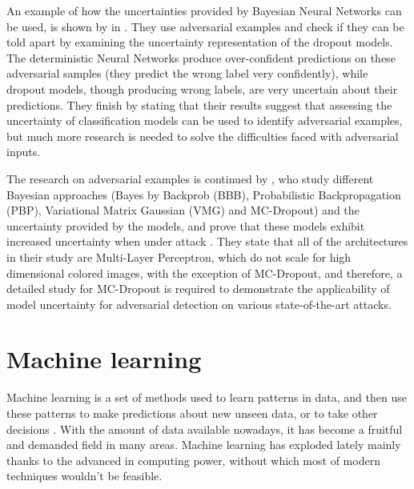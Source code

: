 An example of how the uncertainties provided by Bayesian Neural Networks can be used, is shown by \citeauthor{li2017dropout} in \cite{li2017dropout}. They use adversarial examples and check if they can be told apart by examining the uncertainty representation of the dropout models. The deterministic Neural Networks produce over-confident predictions on these adversarial samples (they predict the wrong label very confidently), while dropout models, though producing wrong labels, are very uncertain about their predictions. They finish by stating that their results suggest that assessing the uncertainty of classification models can be used to identify adversarial examples, but much more research is needed to solve the difficulties faced with adversarial inputs.

The research on adversarial examples is continued by \citeauthor{rawat2017adversarial}, who study different Bayesian approaches (Bayes by Backprob (BBB), Probabilistic Backpropagation (PBP), Variational Matrix Gaussian (VMG) and MC-Dropout) and the uncertainty provided by the models, and prove that these models exhibit increased uncertainty when under attack \cite{rawat2017adversarial}. They state that all of the architectures in their study are Multi-Layer Perceptron, which do not scale for high dimensional colored images, with the exception of MC-Dropout, and therefore, a detailed study for MC-Dropout is required to demonstrate the applicability of model uncertainty for adversarial detection on various state-of-the-art attacks.


\section{Machine learning}

Machine learning is a set of methods used to learn patterns in data, and then use these patterns to make predictions about new unseen data, or to take other decisions \cite{murphy2012machine}. With the amount of data available nowadays, it has become a fruitful and demanded field in many areas. Machine learning has exploded lately mainly thanks to the advanced in computing power, without which most of modern techniques wouldn't be feasible.

